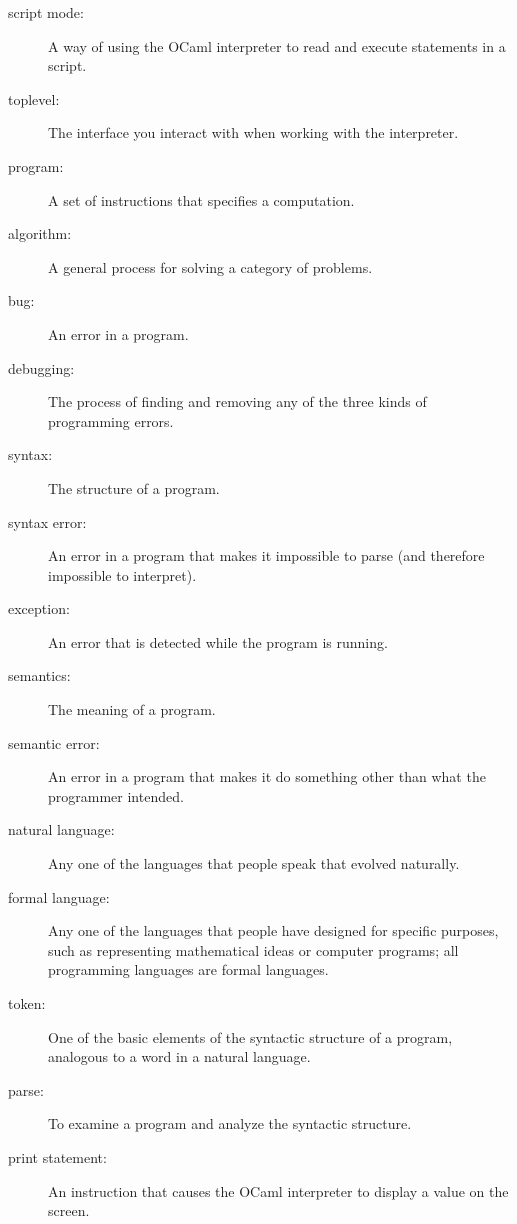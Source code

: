 \documentclass[10pt]{book}
\begin{document}
\begin{description}
\item[script mode:] A way of using the OCaml interpreter to read and execute statements in a script.

\item[toplevel:] The interface you interact with when working with the interpreter.

\item[program:] A set of instructions that specifies a computation.

\item[algorithm:]  A general process for solving a category of problems.

\item[bug:]  An error in a program.

\item[debugging:]  The process of finding and removing any of the three kinds of programming errors.

\item[syntax:]  The structure of a program.

\item[syntax error:]  An error in a program that makes it impossible to parse (and therefore impossible to interpret).

\item[exception:]  An error that is detected while the program is running.

\item[semantics:]  The meaning of a program.

\item[semantic error:]   An error in a program that makes it do something other than what the programmer intended.

\item[natural language:]  Any one of the languages that people speak that evolved naturally.

\item[formal language:]  Any one of the languages that people have designed for specific purposes, such as representing mathematical ideas or computer programs; all programming languages are formal languages.

\item[token:]  One of the basic elements of the syntactic structure of a program, analogous to a word in a natural language.

\item[parse:]  To examine a program and analyze the syntactic structure.

\item[print statement:]  An instruction that causes the OCaml interpreter to display a value on the screen.


\end{description}
\end{document}
